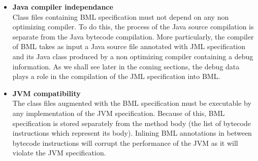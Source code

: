 \begin{itemize}

\item \textbf{Java compiler independance } \\
      Class files containing BML specification must not depend on 
      any non optimizing compiler. 
      To do this, the process of the Java source compilation is separate from the Java bytecode compilation. 
      More particularly, the compiler of BML takes as input a Java source file annotated with JML
      specification and its Java class produced by a non optimizing compiler containing a
      debug information. As we shall see later in the coming sections, the debug data plays a role in the
      compilation of the JML specification into BML.
      

\item \textbf{JVM compatibility } \\
            The class files augmented with the BML specification must be executable by any implementation of the JVM specification. 
            Because of this, BML specification is stored separately from the method body (the list of bytecode instructions which represent its body).
	    Inlining BML annotations in between bytecode instructions will corrupt 
	    the performance of the JVM as it will violate the JVM specification. 
	    

\end{itemize}
